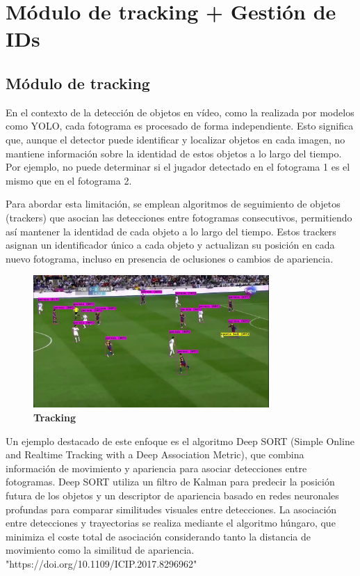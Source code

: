 \documentclass[12pt, a4paper, twoside]{article}
\begin{document}
	
	\section{Módulo de tracking + Gestión de IDs}
	
	
	\subsection{Módulo de tracking}
	En el contexto de la detección de objetos en vídeo, como la realizada por modelos como YOLO, cada fotograma es procesado de forma independiente. Esto significa que, aunque el detector puede identificar y localizar objetos en cada imagen, no mantiene información sobre la identidad de estos objetos a lo largo del tiempo. Por ejemplo, no puede determinar si el jugador detectado en el fotograma 1 es el mismo que en el fotograma 2.
	
	Para abordar esta limitación, se emplean algoritmos de seguimiento de objetos (trackers) que asocian las detecciones entre fotogramas consecutivos, permitiendo así mantener la identidad de cada objeto a lo largo del tiempo. Estos trackers asignan un identificador único a cada objeto y actualizan su posición en cada nuevo fotograma, incluso en presencia de oclusiones o cambios de apariencia.
	
	\begin{figure}[H]
		\centering
		\includegraphics[width=0.8\textwidth]{image/tracking_id}
		\caption{\textbf{Tracking}}
		\label{tracking_id}
	\end{figure}
	
	Un ejemplo destacado de este enfoque es el algoritmo Deep SORT (Simple Online and Realtime Tracking with a Deep Association Metric), que combina información de movimiento y apariencia para asociar detecciones entre fotogramas. Deep SORT utiliza un filtro de Kalman para predecir la posición futura de los objetos y un descriptor de apariencia basado en redes neuronales profundas para comparar similitudes visuales entre detecciones. La asociación entre detecciones y trayectorias se realiza mediante el algoritmo húngaro, que minimiza el coste total de asociación considerando tanto la distancia de movimiento como la similitud de apariencia.
	"https://doi.org/10.1109/ICIP.2017.8296962"
	
\end{document}
